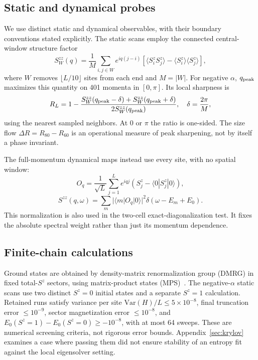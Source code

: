 \subsection{Static and dynamical probes}
\label{sec:diagnostics}

We use distinct static and dynamical observables, with their boundary
conventions stated explicitly.
The static scans employ the connected central-window structure factor
\begin{equation}
 S_W^{zz}(q)=\frac{1}{M}\sum_{i,j\in W}e^{iq(j-i)}
 [\langle S_i^zS_j^z\rangle-\langle S_i^z\rangle\langle S_j^z\rangle],
 \label{eq:static}
\end{equation}
where $W$ removes $\lfloor L/10\rfloor$ sites from each end and $M=|W|$.
For negative $\alpha$, $q_{\mathrm{peak}}$ maximizes this quantity on 401 momenta in
$[0,\pi]$.
Its local sharpness is
\begin{equation}
 R_L=1-\frac{S_W^{zz}(q_{\mathrm{peak}}-\delta)+S_W^{zz}(q_{\mathrm{peak}}+\delta)}
 {2S_W^{zz}(q_{\mathrm{peak}})},\quad \delta=\frac{2\pi}{M},
 \label{eq:ratio}
\end{equation}
using the nearest sampled neighbors. At $0$ or $\pi$ the ratio is one-sided.
The size flow $\Delta R=R_{80}-R_{60}$ is an operational measure of peak
sharpening, not by itself a phase invariant.

The full-momentum dynamical maps instead use every site, with no spatial window:
\begin{equation}
 O_q=\frac{1}{\sqrt L}\sum_{j=1}^Le^{iqj}
 (S_j^z-\langle0|S_j^z|0\rangle),
 \label{eq:momentum-source}
\end{equation}
\begin{equation}
 S^{zz}(q,\omega)=\sum_m|\langle m|O_q|0\rangle|^2
 \delta(\omega-E_m+E_0).
 \label{eq:dsf}
\end{equation}
This normalization is also used in the two-cell exact-diagonalization test.
It fixes the absolute spectral weight rather than just its momentum dependence.

\subsection{Finite-chain calculations}
\label{sec:convergence}
\label{sec:dsf}

Ground states are obtained by density-matrix renormalization group (DMRG) in
fixed total-$S^z$ sectors, using matrix-product states
(MPS)~\cite{white1992,schollwoeck2011}.
The negative-$\alpha$ static scans use two distinct $S^z=0$ initial states and a
separate $S^z=1$ calculation. Retained runs satisfy variance per site
$\mathrm{Var}(H)/L\le5\times10^{-8}$, final truncation error
$\le10^{-9}$, sector magnetization error $\le10^{-8}$, and
$E_0(S^z=1)-E_0(S^z=0)\ge-10^{-8}$, with at most 64 sweeps.
These are numerical screening criteria, not rigorous error bounds.
Appendix~\ref{sec:krylov} examines a case where passing them did not ensure
stability of an entropy fit against the local eigensolver setting.


